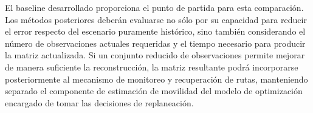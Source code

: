 \documentclass[11pt]{article}
\begin{document}
El baseline desarrollado proporciona el punto de partida para esta comparación. Los métodos posteriores deberán evaluarse no sólo por su capacidad para reducir el error respecto del escenario puramente histórico, sino también considerando el número de observaciones actuales requeridas y el tiempo necesario para producir la matriz actualizada. Si un conjunto reducido de observaciones permite mejorar de manera suficiente la reconstrucción, la matriz resultante podrá incorporarse posteriormente al mecanismo de monitoreo y recuperación de rutas, manteniendo separado el componente de estimación de movilidad del modelo de optimización encargado de tomar las decisiones de replaneación.

\printbibliography
\end{document}
